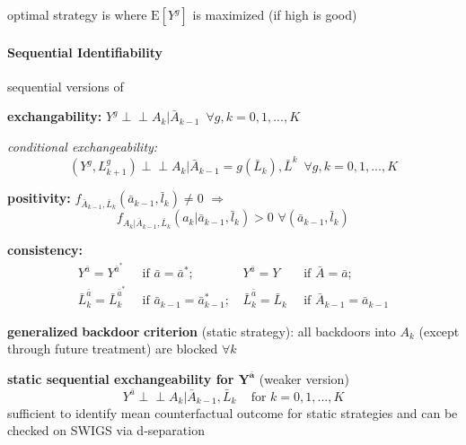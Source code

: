 \documentclass[8pt,twoside]{extarticle}
\newcommand{\indep}{\perp \!\!\! \perp}
\begin{document}
\begin{multicols}{2}
{\begin{minipage}{28em}
\noindent optimal strategy is where $\mathrm{E}\left[Y^g\right]$ is maximized (if high is good)

\end{minipage}}

\vspace{1.5em}

\noindent \colorbox{lightgray!20!white}{\begin{minipage}{28em}


\paragraph{Sequential Identifiability} sequential versions of

 \textbf{exchangability:}
$Y^g \indep A_k| \bar{A}_{k-1} \,\,\, \forall g, k=0,1,...,K$

\textit{conditional exchangeability:}
$$\left(Y^g, L^g_{k+1}\right) \indep A_k| \bar{A}_{k-1} {=} g\left(\bar{L}_k\right), \bar{L}^k \,\,\, \forall g, k=0,1,...,K$$

 \textbf{positivity:} $f_{\bar{A}_{k-1},\bar{L}_k}(\bar{a}_{k-1},\bar{l}_k)\neq 0 \,\, \Rightarrow$
$$ f_{A_k|\bar{A}_{k-1},\bar{L}_k}(a_k|\bar{a}_{k-1},\bar{l}_k)>0 \,\, \forall \left(\bar{a}_{k-1},\bar{l}_k\right)$$

 \textbf{consistency:} 
\begin{align*}
Y^{\bar{a}} = Y^{\bar{a}^*} & \, \text{ if } {\bar{a}} = {\bar{a}^*};  & \,
Y^{\bar{a}} = Y & \, \text{ if } {\bar{A}} = {\bar{a}};  \\
\bar{L}^{\bar{a}}_k = \bar{L}^{\bar{a}^*}_k & \, \text{ if } {\bar{a}_{k-1}} = {\bar{a}^*_{k-1}}; & \,
\bar{L}^{\bar{a}}_k = \bar{L}_k & \, \text{ if } {\bar{A}_{k-1}} = {\bar{a}_{k-1}}
\end{align*}

\end{minipage}}

\vspace{1.5em}

\noindent \colorbox{lightgray!20!white}{\begin{minipage}{28em}


\noindent \textbf{generalized\,\,backdoor\,\,criterion} (static strategy): all backdoors into $A_k$ (except through future treatment) are blocked $\forall k$ 


\noindent \textbf{static sequential exchangeability for $\boldsymbol{Y^{\bar{a}}}$} (weaker version)
$$Y^{\bar{a}} \indep A_k| \bar{A}_{k-1}, \bar{L}_k \,\,\,\,\, \text{ for } k=0,1,...,K$$
sufficient to identify mean counterfactual outcome for static strategies and can be checked on SWIGS via d-separation


\end{minipage}}
\end{multicols}
\end{document}
